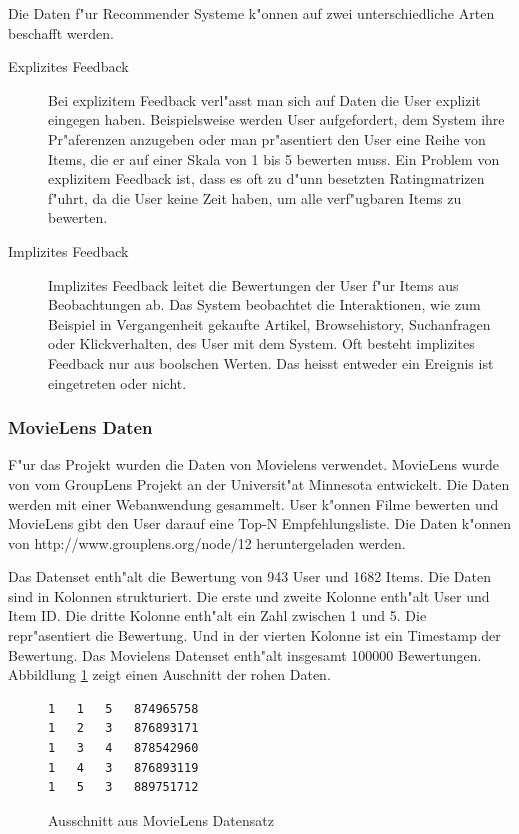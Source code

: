 \documentclass[a4paper, 12pt]{article}
\begin{document}
Die Daten f"ur Recommender Systeme k"onnen auf zwei unterschiedliche Arten beschafft werden.

\begin{description}
\item[Explizites Feedback] Bei explizitem Feedback verl"asst man sich auf Daten die User explizit eingegen haben. Beispielsweise werden User aufgefordert, dem System ihre Pr"aferenzen anzugeben oder man pr"asentiert den User eine Reihe von Items, die er auf einer Skala von 1 bis 5 bewerten muss. Ein Problem von explizitem Feedback ist, dass es oft zu d"unn besetzten Ratingmatrizen f"uhrt, da die User keine Zeit haben, um alle verf"ugbaren Items zu bewerten.
\item[Implizites Feedback] Implizites Feedback leitet die Bewertungen der User f"ur Items aus Beobachtungen ab. Das System beobachtet die Interaktionen, wie zum Beispiel in Vergangenheit gekaufte Artikel, Browsehistory, Suchanfragen oder Klickverhalten, des User mit dem System. Oft besteht implizites Feedback nur aus boolschen Werten. Das heisst entweder ein Ereignis ist eingetreten oder nicht.
\end{description}

\subsubsection{MovieLens Daten}
\label{sec:movielens}

F"ur das Projekt wurden die Daten von Movielens verwendet. MovieLens wurde von vom GroupLens Projekt an der Universit"at Minnesota entwickelt. Die Daten werden mit einer Webanwendung gesammelt. User k"onnen Filme bewerten und MovieLens gibt den User darauf eine Top-N Empfehlungsliste. Die Daten k"onnen von http://www.grouplens.org/node/12 heruntergeladen werden. 

Das Datenset enth"alt die Bewertung von 943 User und 1682 Items. Die Daten sind in Kolonnen strukturiert. Die erste und zweite Kolonne enth"alt User und Item ID. Die dritte Kolonne enth"alt ein Zahl zwischen 1 und 5. Die repr"asentiert die Bewertung. Und in der vierten Kolonne ist ein Timestamp der Bewertung. Das Movielens Datenset enth"alt insgesamt 100000 Bewertungen. Abbildlung \ref{fig:movielens} zeigt einen Auschnitt der rohen Daten.

\begin{figure}
\centering
\begin{verbatim}
1	1	5	874965758
1	2	3	876893171
1	3	4	878542960
1	4	3	876893119
1	5	3	889751712
\end{verbatim}
\caption{Ausschnitt aus MovieLens Datensatz}
\label{fig:movielens}
\end{figure}
\end{document}
